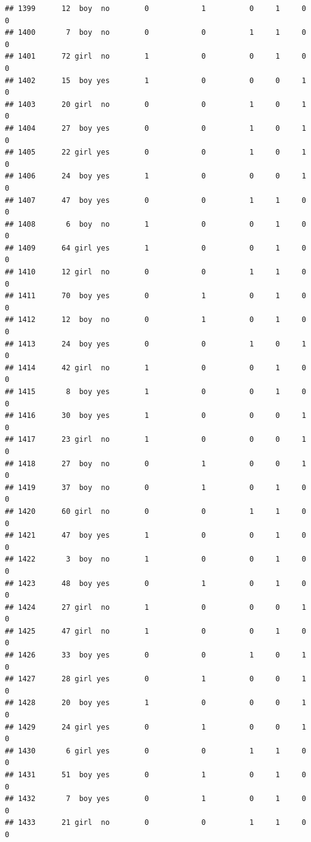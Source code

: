 \documentclass[man]{apa6}
\begin{document}
\begin{verbatim}
## 1399      12  boy  no        0            1          0     1     0     0
## 1400       7  boy  no        0            0          1     1     0     0
## 1401      72 girl  no        1            0          0     1     0     0
## 1402      15  boy yes        1            0          0     0     1     0
## 1403      20 girl  no        0            0          1     0     1     0
## 1404      27  boy yes        0            0          1     0     1     0
## 1405      22 girl yes        0            0          1     0     1     0
## 1406      24  boy yes        1            0          0     0     1     0
## 1407      47  boy yes        0            0          1     1     0     0
## 1408       6  boy  no        1            0          0     1     0     0
## 1409      64 girl yes        1            0          0     1     0     0
## 1410      12 girl  no        0            0          1     1     0     0
## 1411      70  boy yes        0            1          0     1     0     0
## 1412      12  boy  no        0            1          0     1     0     0
## 1413      24  boy yes        0            0          1     0     1     0
## 1414      42 girl  no        1            0          0     1     0     0
## 1415       8  boy yes        1            0          0     1     0     0
## 1416      30  boy yes        1            0          0     0     1     0
## 1417      23 girl  no        1            0          0     0     1     0
## 1418      27  boy  no        0            1          0     0     1     0
## 1419      37  boy  no        0            1          0     1     0     0
## 1420      60 girl  no        0            0          1     1     0     0
## 1421      47  boy yes        1            0          0     1     0     0
## 1422       3  boy  no        1            0          0     1     0     0
## 1423      48  boy yes        0            1          0     1     0     0
## 1424      27 girl  no        1            0          0     0     1     0
## 1425      47 girl  no        1            0          0     1     0     0
## 1426      33  boy yes        0            0          1     0     1     0
## 1427      28 girl yes        0            1          0     0     1     0
## 1428      20  boy yes        1            0          0     0     1     0
## 1429      24 girl yes        0            1          0     0     1     0
## 1430       6 girl yes        0            0          1     1     0     0
## 1431      51  boy yes        0            1          0     1     0     0
## 1432       7  boy yes        0            1          0     1     0     0
## 1433      21 girl  no        0            0          1     1     0     0

\end{verbatim}
\end{document}
